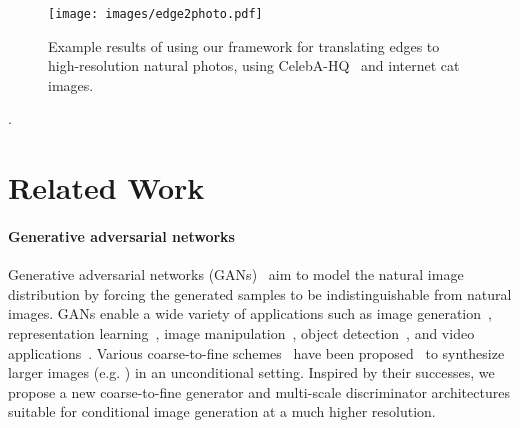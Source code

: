 \documentclass[10pt,twocolumn,letterpaper]{article}
\newcommand{\lblfig}[1]{\label{fig:#1}}
\newcommand{\lblsec}[1]{\label{sec:#1}}
\begin{document}
\begin{figure}[t]
    \centering
    \vspace{-.25in}
    \texttt{[image: images/edge2photo.pdf]}
    \vspace{-.25in}
    \caption{\small Example results of using our framework for translating edges to high-resolution natural photos, using CelebA-HQ~\cite{karras2017progressive} and internet cat images.}
    \lblfig{edge2photo}
    \vspace{-.25in}
\end{figure}.
 \section{Related Work} \lblsec{related}

\paragraph{Generative adversarial networks} 
Generative adversarial networks (GANs)~\cite{goodfellow2014generative} aim to model the natural image distribution by forcing the generated samples to be indistinguishable from natural images. GANs enable a wide variety of applications such as image generation~\cite{radford2015unsupervised,zhao2016energy,arjovsky2017wasserstein}, representation learning~\cite{salimans2016improved}, image manipulation~\cite{zhu2016generative}, object detection~\cite{li2017perceptual}, and video applications~\cite{mathieu2015deep,vondrick2016generating,tulyakov2017mocogan}. Various coarse-to-fine schemes~\cite{burt1983laplacian} have been proposed~\cite{denton2015deep,huang2017sgan,zhang2016stackgan,karras2017progressive} to synthesize larger images (e.g. ) in an unconditional setting. Inspired by their successes, we propose a new coarse-to-fine generator and multi-scale discriminator architectures suitable for conditional image generation at a much higher resolution.
\end{document}
